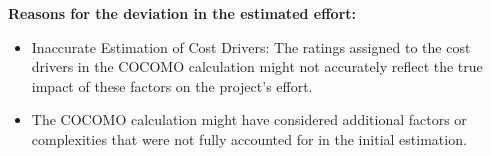 \documentclass[a4paper]{scrartcl}
\begin{document}
\textbf{Reasons for the deviation in the estimated effort:}
\begin{itemize}
  \item Inaccurate Estimation of Cost Drivers: The ratings assigned to the cost drivers in the COCOMO calculation might not accurately reflect the true impact of these factors on the project's effort.
  \item The COCOMO calculation might have considered additional factors or complexities that were not fully accounted for in the initial estimation.
\end{itemize}
\end{document}
